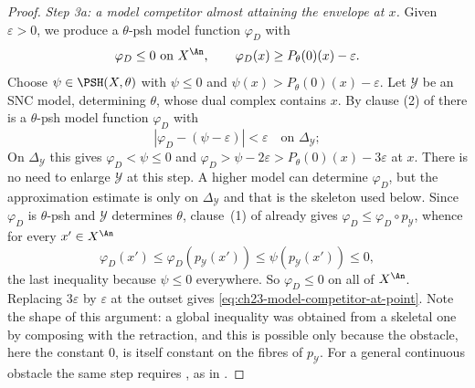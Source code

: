 \begin{proof}
\emph{Step 3a: a model competitor almost attaining the envelope at $x$.}
Given $\varepsilon>0$, we produce a $\theta$-psh model function
$\varphi_D$ with
\begin{equation}\label{eq:ch23-model-competitor-at-point}
             \varphi_D\leq 0\text{ on }X^{\An},
             \qquad
             \varphi_D(x)\geq P_\theta(0)(x)-\varepsilon.
\end{equation}
Choose $\psi\in\PSH(X,\theta)$ with $\psi\leq0$ and
$\psi(x)>P_\theta(0)(x)-\varepsilon$.  Let $\mathcal Y$ be an SNC model,
determining $\theta$, whose dual complex contains $x$.  By clause (2) of
 there is a $\theta$-psh model function
$\varphi_D$ with
\[
 \left|\varphi_D-(\psi-\varepsilon)\right|<\varepsilon
 \quad\text{on }\Delta_{\mathcal Y};
\]
On $\Delta_{\mathcal Y}$ this gives
$\varphi_D<\psi\leq0$ and
$\varphi_D>\psi-2\varepsilon>P_\theta(0)(x)-3\varepsilon$ at $x$.
There is no need to enlarge $\mathcal Y$ at this step.  A higher model
can determine $\varphi_D$, but the approximation estimate is only on
$\Delta_{\mathcal Y}$ and that is the skeleton used below.  Since
$\varphi_D$ is $\theta$-psh and $\mathcal Y$ determines $\theta$,
clause~(1) of  already gives
$\varphi_D\leq\varphi_D\circ p_{\mathcal Y}$, whence for every
$x'\in X^{\An}$
\[
       \varphi_D(x')
       \leq\varphi_D(p_{\mathcal Y}(x'))
       \leq\psi(p_{\mathcal Y}(x'))\leq0 ,
\]
the last inequality because $\psi\leq0$ everywhere.  So $\varphi_D\leq0$
on all of $X^{\An}$.  Replacing $3\varepsilon$ by $\varepsilon$ at the
outset gives \eqref{eq:ch23-model-competitor-at-point}.  Note the shape of
this argument: a global inequality was obtained from a skeletal one by
composing with the retraction, and this is possible only because the
obstacle, here the constant $0$, is itself constant on the fibres of
$p_{\mathcal Y}$.  For a general continuous obstacle the same step
requires , as in
.


\end{proof}
